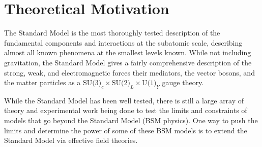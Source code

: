 \documentclass[12pt]{article}
\newcommand{\muEtoEE}{\mu^- e^- \to e^- e^-}
\begin{document}
\begin{abstract}
The completed study will provide an estimate of the achievable Mu2e sensitivity to $\muEtoEE$ and predict optimal experimental condition requirements necessary to perform a statistically significant search for this process.

\end{abstract}

\tableofcontents
\clearpage


\section{Theoretical Motivation}\label{sec:Theory}

The Standard Model is the most thoroughly tested description of the fundamental components and interactions at the subatomic scale, describing almost all known phenomena at the smallest levels known. While not including gravitation, the Standard Model gives a fairly comprehensive description of the strong, weak, and electromagnetic forces their mediators, the vector bosons, and the matter particles as a $\text{SU(3)}_c \times \text{SU(2)}_L \times \text{U(1)}_Y$ gauge theory. 

While the Standard Model has been well tested, there is still a large array of theory and experimental work being done to test the limits and constraints of models that go beyond the Standard Model (BSM physics). One way to push the limits and determine the power of some of these BSM models is to extend the Standard Model via effective field theories. 
\end{document}
